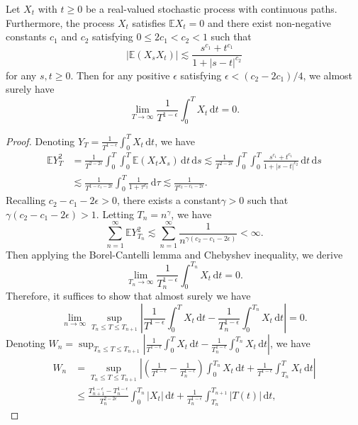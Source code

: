 \documentclass[10pt,a4paper]{amsart}
\begin{document}
\begin{Le}\label{Thm2.1}
	Let $X_t$ with $t \ge 0$ be a real-valued stochastic process with continuous paths. Furthermore, the process $X_t$ satisfies $\mathbb{E}X_t=0$ and there exist non-negative constants $c_1$ and $c_2$ satisfying $0 \le 2 c_1 < c_2 <1$ such that \[
	| \mathbb{E}(X_s X_t) |\lesssim \frac{s^{c_1}+t^{c_1}}{1+|s-t|^{c_2}}
	\] for any $s,t  \ge 0$. Then for any positive $\epsilon$ satisfying $\epsilon < (c_2-2c_1) /4$, we almost surely have \[
	\lim_{T \to \infty} \frac{1}{T^{1-\epsilon}} \int_0^T X_t \,\mathrm{d}t =0
	.\]
\end{Le}

\begin{proof}
	Denoting $Y_T=\frac{1}{T^{1-\epsilon}}\int_0^T X_t \,\mathrm{d}t$, we have  \begin{align*}
		\mathbb{E}Y_T^2 &=\frac{1}{T^{2-2\epsilon}} \int_0^T \int_0^T \mathbb{E}({X}_t {X}_s)\,\mathrm{d}t\,\mathrm{d}s \lesssim \frac{1}{T^{2-2\epsilon} }\int_0^T \int_0^T \frac{s^{c_1}+t^{c_1}}{1+|s-t|^{c_2}} \,\mathrm{d}t\,\mathrm{d}s \\ &\lesssim \frac{1}{T^{1-{c_1}-2\epsilon}}  \int_0^T \frac{1}{1+\tau^{c_2}}\,\mathrm{d}\tau \lesssim \frac{1}{T^{c_2-c_1-2\epsilon}}.
	\end{align*}
	Recalling ${c_2}-{c_1}-2\epsilon>0$, there exists a constant$\gamma>0$ such that $\gamma({c_2}-{c_1}-2\epsilon)>1$. Letting $T_n=n^\gamma$, we have \[
	\sum_{n=1}^\infty \mathbb{E}Y_{T_n}^2 \lesssim \sum_{n=1}^\infty \frac{1}{n^{\gamma({c_2}-{c_1}-2\epsilon)}} < \infty.
	\] Then applying the  Borel-Cantelli lemma and Chebyshev inequality, we derive \[
	\lim_{T_n \to \infty} \frac{1}{T_n^{1-\epsilon}} \int_0^{T_n} X_t \,\mathrm{d}t =0.
	\] Therefore, it suffices to show that almost surely we have \begin{equation}\label{2.3}
		\lim_{n\to \infty} \sup_{T_n \le T \le T_{n+1}} \left|\frac{1}{T^{1-\epsilon}} \int_0^T X_t \,\mathrm{d}t-\frac{1}{T_n^{1-\epsilon}} \int_0^{T_n} X_t \,\mathrm{d}t \right| =0.
	\end{equation}
	Denoting 
	$
	W_n=\sup_{T_n \le T \le T_{n+1}} \left|\frac{1}{T^{1-\epsilon}} \int_0^T X_t \,\mathrm{d}t-\frac{1}{T_n^{1-\epsilon}} \int_0^{T_n} X_t \,\mathrm{d}t \right|
	$, we have
	\begin{align*}
		W_n  &=  \sup_{T_n \le T \le T_{n+1}} \left| \left(\frac{1}{T^{1-\epsilon}}-\frac{1}{T_n^{1-\epsilon}} \right)\int_0^{T_n} X_t \,\mathrm{d}t+\frac{1}{T^{1-\epsilon}} \int_{T_n}^T X_t \,\mathrm{d}t \right| \\ &\le \frac{T_{n+1}^{1-\epsilon}-T_n^{1-\epsilon}}{T_n^{2-2\epsilon}} \int_0^{T_n} |X_t| \,\mathrm{d}t + \frac{1}{T_n^{1-\epsilon}} \int_{T_n}^{T_{n+1}} |T(t)|\,\mathrm{d}t,

\end{align*}
\end{proof}
\end{document}
